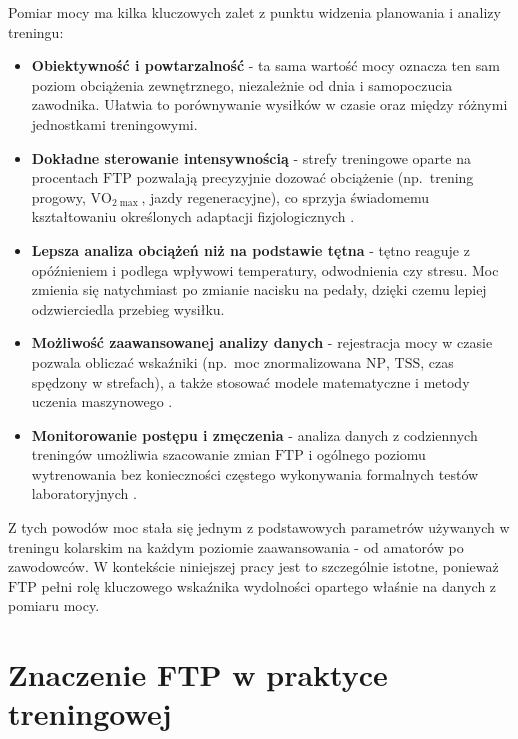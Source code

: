 Pomiar mocy ma kilka kluczowych zalet z punktu widzenia planowania i analizy treningu:
\begin{itemize}
  \item \textbf{Obiektywność i powtarzalność} - ta sama wartość mocy oznacza ten sam poziom obciążenia zewnętrznego, niezależnie od dnia i samopoczucia zawodnika. Ułatwia to porównywanie wysiłków w czasie oraz między różnymi jednostkami treningowymi.
  \item \textbf{Dokładne sterowanie intensywnością} - strefy treningowe oparte na procentach $\mathrm{FTP}$ pozwalają precyzyjnie dozować obciążenie (np.\ trening progowy, $\text{VO}_{2\max}$, jazdy regeneracyjne), co sprzyja świadomemu kształtowaniu określonych adaptacji fizjologicznych \parencite{allen2019power}.
  \item \textbf{Lepsza analiza obciążeń niż na podstawie tętna} - tętno reaguje z opóźnieniem i podlega wpływowi temperatury, odwodnienia czy stresu. Moc zmienia się natychmiast po zmianie nacisku na pedały, dzięki czemu lepiej odzwierciedla przebieg wysiłku.
  \item \textbf{Możliwość zaawansowanej analizy danych} - rejestracja mocy w czasie pozwala obliczać wskaźniki (np.\ moc znormalizowana $\mathrm{NP}$, $\mathrm{TSS}$, czas spędzony w strefach), a także stosować modele matematyczne i metody uczenia maszynowego \parencite{stockwell2023mlftp,denham2020predictftp}.
  \item \textbf{Monitorowanie postępu i zmęczenia} - analiza danych z codziennych treningów umożliwia szacowanie zmian $\mathrm{FTP}$ i ogólnego poziomu wytrenowania bez konieczności częstego wykonywania formalnych testów laboratoryjnych \parencite{borszcz2018ftp,karsten2021cpftp,denham2020predictftp}.
\end{itemize}

Z tych powodów moc stała się jednym z podstawowych parametrów używanych w treningu kolarskim na każdym poziomie zaawansowania - od amatorów po zawodowców.
W kontekście niniejszej pracy jest to szczególnie istotne, ponieważ $\mathrm{FTP}$ pełni rolę kluczowego wskaźnika wydolności opartego właśnie na danych z pomiaru mocy.

\section{Znaczenie FTP w praktyce treningowej}

